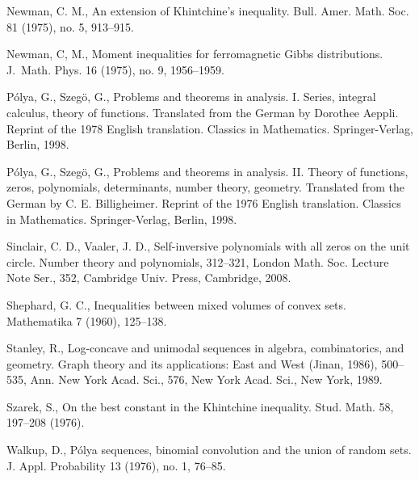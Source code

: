 \documentclass[10pt]{article}
\newcommand{\1}{\textbf{1}}
\theoremstyle{remark}
\theoremstyle{definition}
\begin{document}
\begin{thebibliography}{9}
Newman, C. M.,
An extension of Khintchine's inequality.
Bull. Amer. Math. Soc. 81 (1975), no. 5, 913--915.


Newman, C, M.,
Moment inequalities for ferromagnetic Gibbs distributions. J.~Math. Phys. 16 (1975), no. 9, 1956--1959.


P\'olya, G., Szeg\"o, G., 
Problems and theorems in analysis. I. Series, integral calculus, theory of functions. Translated from the German by Dorothee Aeppli. Reprint of the 1978 English translation. Classics in Mathematics. Springer-Verlag, Berlin, 1998.


P\'olya, G., Szeg\"o, G., 
Problems and theorems in analysis. II. Theory of functions, zeros, polynomials, determinants, number theory, geometry. Translated from the German by C. E. Billigheimer. Reprint of the 1976 English translation. Classics in Mathematics. Springer-Verlag, Berlin, 1998.


Sinclair, C. D., Vaaler, J. D.,
Self-inversive polynomials with all zeros on the unit circle. Number theory and polynomials, 312--321,
London Math. Soc. Lecture Note Ser., 352, Cambridge Univ. Press, Cambridge, 2008.

Shephard, G. C.,
Inequalities between mixed volumes of convex sets.
Mathematika 7 (1960), 125--138.


Stanley, R.,
Log-concave and unimodal sequences in algebra, combinatorics, and geometry. Graph theory and its applications: East and West (Jinan, 1986), 500--535,
Ann. New York Acad. Sci., 576, New York Acad. Sci., New York, 1989.



Szarek, S.,
On the best constant in the Khintchine inequality.
Stud. Math. 58, 197--208 (1976).

Walkup, D., P\'olya sequences, binomial convolution and the union of random sets.
J. Appl. Probability 13 (1976), no. 1, 76--85.


\end{thebibliography}
\end{document}
